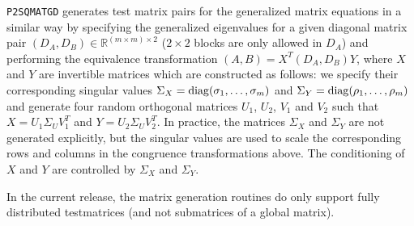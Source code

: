 \documentclass[11pt]{article}
\begin{document}
\texttt{P2SQMATGD} generates test matrix pairs for the generalized
matrix equations in a similar way by specifying the generalized
eigenvalues for a given diagonal matrix pair $(D_A,D_B) \in
\mathbb{R}^{(m \times m) \times 2}$ ($2 \times 2$ blocks are only
allowed in $D_A$) and performing the equivalence transformation
$(A,B) = X^T(D_A,D_B)Y$, where $X$ and $Y$ are invertible matrices
which are constructed as follows: we specify their corresponding
singular values $\Sigma_{X}={\rm diag}(\sigma_1,\ldots,\sigma_m)$
and $\Sigma_{Y}={\rm diag}(\rho_1,\ldots,\rho_m)$ and generate
four random orthogonal matrices $U_1$, $U_2$, $V_1$ and $V_2$ such
that $X=U_1\Sigma_UV_1^T$ and $Y=U_2\Sigma_UV_2^T$. In practice,
the matrices $\Sigma_{X}$ and $\Sigma_{Y}$ are not generated
explicitly, but the singular values are used to scale the
corresponding rows and columns in the congruence transformations
above. The conditioning of $X$ and $Y$ are controlled by
$\Sigma_{X}$ and $\Sigma_{Y}$.
%


In the current release, the matrix generation routines do only
support fully distributed testmatrices (and not submatrices of a
global
matrix). %
\end{document}
